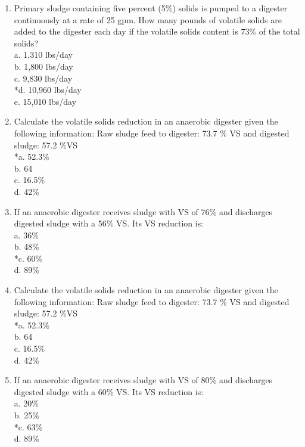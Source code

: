 \documentclass{article}
\begin{document}
\begin{enumerate}
\item  Primary sludge containing five percent (5\%) solids is pumped to a digester continuously at a rate of 25 gpm. How many pounds of volatile solids are added to the digester each day if the volatile solids content is 73\% of the total solids? \\

a. 1,310 lbs/day \\
b. 1,800 lbs/day \\
c. 9,830 lbs/day \\
*d. 10,960 lbs/day \\
e. 15,010 lbs/day \\

\item  Calculate the volatile solids reduction in an anaerobic digester given the following information:  Raw sludge feed to digester:  73.7 \% VS and digested sludge: 57.2 \%VS \\

*a. 52.3\% \\
b. 64 \\
c. 16.5\% \\
d. 42\% \\

\item  If an anaerobic digester receives sludge with VS of 76\% and discharges digested sludge with a 56\% VS.  Its VS reduction is: \\

a. 36\% \\
b. 48\% \\
*c. 60\% \\
d. 89\% \\

\item  Calculate the volatile solids reduction in an anaerobic digester given the following information:  Raw sludge feed to digester:  73.7 \% VS and digested sludge: 57.2 \%VS \\

*a. 52.3\% \\
b. 64 \\
c. 16.5\% \\
d. 42\% \\

\item  If an anaerobic digester receives sludge with VS of 80\% and discharges digested sludge with a 60\% VS.  Its VS reduction is: \\

a. 20\% \\
b. 25\% \\
*c. 63\% \\
d. 89\% \\


\end{enumerate}
\end{document}

